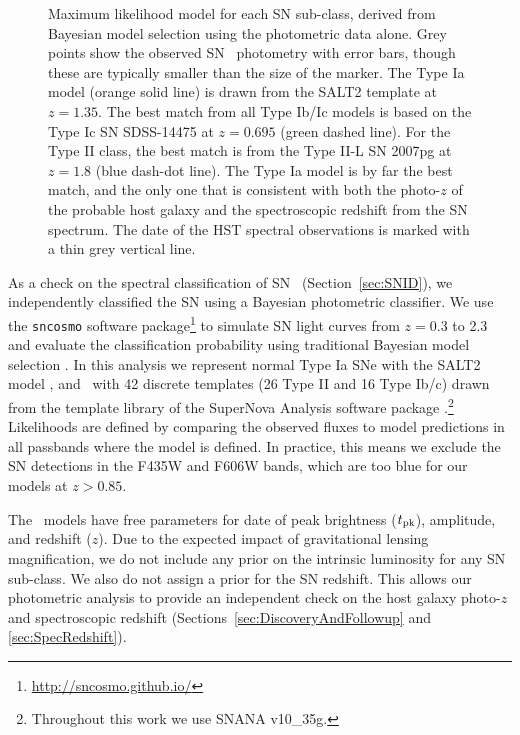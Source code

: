 \begin{figure}
\begin{center}
\caption{ 
Maximum likelihood model for each SN sub-class, derived from Bayesian
model selection using the photometric data alone. Grey points show the
observed SN \tomas\ photometry with error bars, though these are
typically smaller than the size of the marker.  The Type Ia model
(orange solid line) is drawn from the SALT2 template at $z=1.35$. The
best match from all Type Ib/Ic models is based on the Type Ic SN
SDSS-14475 at $z=0.695$ (green dashed line). For the Type II class,
the best match is from the Type II-L SN 2007pg at $z=1.8$ (blue
dash-dot line). The Type Ia model is by far the best match, and the
only one that is consistent with both the photo-$z$ of the probable
host galaxy and the spectroscopic redshift from the SN spectrum.  The
date of the HST spectral observations is marked with a thin grey
vertical line.
\label{fig:photoclass} }
\end{center}
\end{figure}

As a check on the spectral classification of SN \tomas\
(Section~\ref{sec:SNID}), we independently classified the SN using a
Bayesian photometric classifier.  We use the {\tt sncosmo} software
package\footnote{\url{http://sncosmo.github.io/}} to simulate SN light
curves from $z=0.3$ to 2.3 and evaluate the classification probability
using traditional Bayesian model selection \citep[as
in][]{Jones:2013,Rodney:2014,Graur:2014,Rodney:2015a}.  In this
analysis we represent normal Type Ia SNe with the SALT2
model \citep{Guy:2010}, and \CCSNe\ with 42 discrete templates (26
Type II and 16 Type Ib/c) drawn from the template library of the
SuperNova Analysis software
package \citep[SNANA,][]{Kessler:2009a}.\footnote{Throughout this work
we use SNANA v10\_35g.}  Likelihoods are defined by comparing the
observed fluxes to model predictions in all passbands where the model
is defined.  In practice, this means we exclude the SN detections in
the F435W and F606W bands, which are too blue for our models at
$z>0.85$.

The \CCSN\ models have free parameters for date of peak brightness
($t_{\rm pk}$), amplitude, and redshift ($z$). Due to the expected
impact of gravitational lensing magnification, we do not include any
prior on the intrinsic luminosity for any SN sub-class.  We also do
not assign a prior for the SN redshift. This allows our photometric
analysis to provide an independent check on the host galaxy photo-$z$
and spectroscopic redshift (Sections~\ref{sec:DiscoveryAndFollowup}
and \ref{sec:SpecRedshift}).

